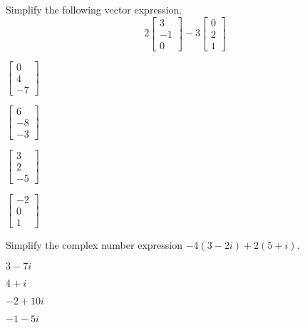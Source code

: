 \documentclass{article}
\begin{document}
\begin{readinessAssuranceTest}

\item Simplify the following vector expression.
  \[
  2
  \begin{bmatrix}
    3 \\ -1 \\ 0
  \end{bmatrix}-
  3
  \begin{bmatrix}
    0 \\ 2 \\ 1
  \end{bmatrix}
  \]

\begin{multicols}{4}
\begin{readinessAssuranceTestChoices}
\item \(
        \begin{bmatrix}
          0 \\ 4 \\ -7
        \end{bmatrix}
      \)
\item \(
        \begin{bmatrix}
          6 \\ -8 \\ -3
        \end{bmatrix}
      \)
\item \(
        \begin{bmatrix}
          3 \\ 2 \\ -5
        \end{bmatrix}
      \)
\item \(
        \begin{bmatrix}
          -2 \\ 0 \\ 1
        \end{bmatrix}
      \)
\end{readinessAssuranceTestChoices}
\end{multicols}

\item Simplify the complex number expression
      \(-4(3-2i)+2(5+i)\).

\begin{multicols}{4}
\begin{readinessAssuranceTestChoices}
\item \(3-7i\)
\item \(4+i\)
\item \(-2+10i\)
\item \(-1-5i\)
\end{readinessAssuranceTestChoices}
\end{multicols}


\end{readinessAssuranceTest}
\end{document}
